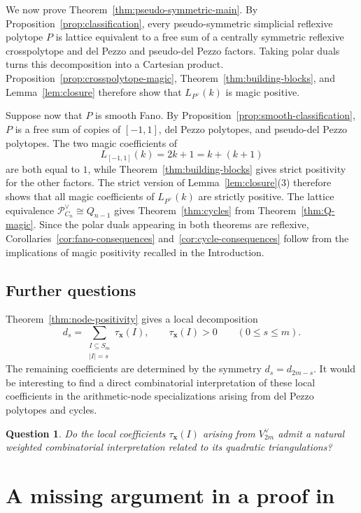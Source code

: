 \documentclass[12pt]{amsart}
\newtheorem{Question}[Theorem]{Question}
\theoremstyle{definition}
\newcommand{\PP}{\mathcal P}
\begin{document}
We now prove Theorem~\ref{thm:pseudo-symmetric-main}.
By Proposition~\ref{prop:classification}, every pseudo-symmetric
simplicial reflexive polytope $P$ is lattice equivalent to a free sum
of a centrally symmetric reflexive crosspolytope and del Pezzo and
pseudo-del Pezzo factors.
Taking polar duals turns this decomposition into a Cartesian product.
Proposition~\ref{prop:crosspolytope-magic},
Theorem~\ref{thm:building-blocks}, and Lemma~\ref{lem:closure}
therefore show that $L_{P^\vee}(k)$ is magic positive.

Suppose now that $P$ is smooth Fano.
By Proposition~\ref{prop:smooth-classification}, $P$ is a free sum of
copies of $[-1,1]$, del Pezzo polytopes, and pseudo-del Pezzo polytopes.
The two magic coefficients of
\[
L_{[-1,1]}(k)=2k+1=k+(k+1)
\]
are both equal to $1$, while
Theorem~\ref{thm:building-blocks} gives strict positivity for the other
factors.
The strict version of Lemma~\ref{lem:closure}(3) therefore shows that
all magic coefficients of $L_{P^\vee}(k)$ are strictly positive.
The lattice equivalence $\PP_{C_n}^\vee\cong Q_{n-1}$
\cite[Proposition~4.6 and its proof]{KonoikeCycles} gives
Theorem~\ref{thm:cycles} from Theorem~\ref{thm:Q-magic}.
Since the polar duals appearing in both theorems are reflexive,
Corollaries~\ref{cor:fano-consequences} and~\ref{cor:cycle-consequences}
follow from the implications of magic positivity recalled in the
Introduction.

\subsection{Further questions}

Theorem~\ref{thm:node-positivity} gives a local decomposition
\[
d_s
=
\sum_{\substack{I\subseteq S_m\\|I|=s}}
\tau_{\mathbf x}(I),
\qquad
\tau_{\mathbf x}(I)>0
\qquad (0\le s\le m).
\]
The remaining coefficients are determined by the symmetry
$d_s=d_{2m-s}$.
It would be interesting to find a direct combinatorial interpretation of
these local coefficients in the arithmetic-node specializations arising
from del Pezzo polytopes and cycles.

\begin{Question}
Do the local coefficients $\tau_{\mathbf x}(I)$ arising from
$V_{2m}^\vee$ admit a natural weighted combinatorial interpretation
related to its quadratic triangulations?
\end{Question}


\appendix

\section{A missing argument in a proof in  \cite{OhsugiTsuchiyaLocally}}
\label{app:previous-proof}
\end{document}
